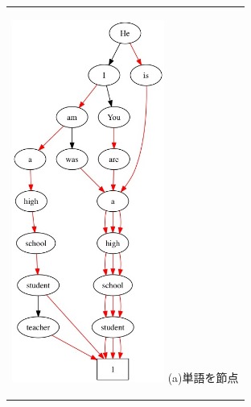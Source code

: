 \documentclass[12pt,twoside, fleqn]{ujbook}
\begin{document}
	\begin{figure}[htbp]
	\begin{center}
	\begin{tabular}{c}
		\begin{minipage}{0.4\hsize}
			\begin{center}
			\includegraphics [clip, width=5cm]{./img/seq_word.jpeg}
			\hspace{1.6cm} (a)単語を節点
			\end{center}
		\end{minipage}


\end{tabular}
\end{center}
\end{figure}
\end{document}
